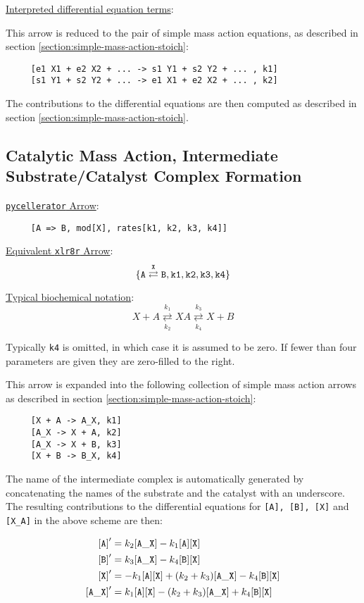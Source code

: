 \underline{Interpreted differential equation terms}: 

This arrow is reduced to the pair of simple mass action equations, as described in section \ref{section:simple-mass-action-stoich}: 

\begin{lstlisting}
     [e1 X1 + e2 X2 + ... -> s1 Y1 + s2 Y2 + ... , k1]
     [s1 Y1 + s2 Y2 + ... -> e1 X1 + e2 X2 + ... , k2]
\end{lstlisting}

The contributions to the differential equations are then computed as described in section \ref{section:simple-mass-action-stoich}.

\subsection{Catalytic Mass Action, Intermediate Substrate/Catalyst Complex Formation}
\label{section:cat-mass-action}

\underline{{\tt pycellerator} Arrow}: 
\begin{lstlisting} 
     [A => B, mod[X], rates[k1, k2, k3, k4]]
\end{lstlisting}
\underline{Equivalent {\tt xlr8r} Arrow}:
$$\tt\{A \overset{X}{\rightleftarrows} B,k1,k2,k3,k4 \}$$

\underline{Typical biochemical notation}: 
$$ X+A\underset{k_2}{\overset{k_1}  \rightleftarrows } XA \underset{k_4}{ \overset{k_3}{\rightleftarrows}} X+B$$

Typically {\tt k4} is omitted, in which case it is assumed to be zero. If fewer than four parameters are given they are zero-filled to the right. 

This arrow is expanded into the following collection of simple mass action arrows as described in section \ref{section:simple-mass-action-stoich}:

\begin{lstlisting}
     [X + A -> A_X, k1]
     [A_X -> X + A, k2]
     [A_X -> X + B, k3]
     [X + B -> B_X, k4]
\end{lstlisting}

The name of the intermediate complex is automatically generated by concatenating the names of the substrate and the catalyst with an underscore. The resulting contributions to the differential equations for {\tt [A], [B], [X]} and {\tt [X\_A]} in the above scheme are then: 

\begin{align*}
{\tt [A]}'&=k_2 {\tt [A\_X]} - k_1 {\tt [A][X]}\\
{\tt [B]}'&=k_3 {\tt [A\_X]} -  k_4 {\tt [B][X]}\\
{\tt [X]}'&=-k_1 {\tt [A][X]} + (k_2+k_3) {\tt [A\_X]}- k_4 {\tt [B][X]}\\
{\tt [A\_X]}'&= k_1 {\tt [A][X]} - (k_2 + k_3) {\tt [A\_X]} + k_4 {\tt [B][X]}
\end{align*}

